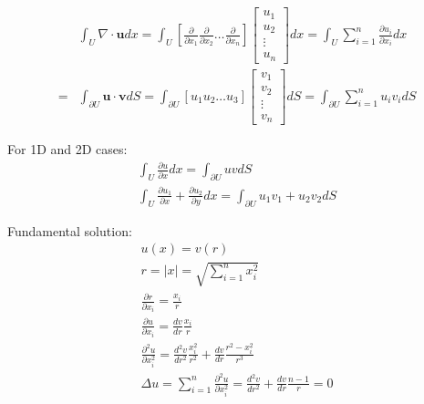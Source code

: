 \documentclass{article}
\begin{document}
\begin{theorem}
    \begin{equation}
        \begin{aligned}
              & \int_{U} \nabla \cdot \boldsymbol{u} dx =
            \int_{U}
            \left[ \frac{\partial}{\partial x_{1}} \frac{\partial}{\partial x_{2}} \dots \frac{\partial}{\partial x_{n}} \right]
            \begin{bmatrix}
                u_{1}  \\
                u_{2}  \\
                \vdots \\
                u_{n}
            \end{bmatrix} dx
            = \int_{U} \sum_{i=1}^{n} \frac{\partial u_{i}}{\partial x_{i}} dx \\
            = & \int_{\partial U} \boldsymbol{u} \cdot \boldsymbol{v} dS
            = \int_{\partial U}
            \left[ u_{1} u_{2} \dots u_{3} \right]
            \begin{bmatrix}
                v_{1}  \\
                v_{2}  \\
                \vdots \\
                v_{n}
            \end{bmatrix} dS
            = \int_{\partial U} \sum_{i=1}^{n} u_{i}v_{i} dS
        \end{aligned}
    \end{equation}
\end{theorem}

\begin{example}
    For 1D and 2D cases:
    \begin{gather*}
        \int_{U} \frac{\partial u}{\partial x} dx = \int_{\partial U} uv dS \\
        \int_{U} \frac{\partial u_{1}}{\partial x} + \frac{\partial u_{2}}{\partial y} dx =
        \int_{\partial U} u_{1}v_{1} + u_{2}v_{2} dS
    \end{gather*}
\end{example}

Fundamental solution:
\begin{gather*}
    u(x) = v(r) \\
    r = |x| = \sqrt{\sum_{i=1}^{n}x_{i}^{2}} \\
    \frac{\partial r}{\partial x_{i}} = \frac{x_{i}}{r} \\
    \frac{\partial u}{\partial x_{i}} = \frac{dv}{dr} \frac{x_{i}}{r} \\
    \frac{\partial^{2} u}{\partial x_{i}^{2}} = \frac{d^{2}v}{dr^{2}} \frac{x_{i}^{2}}{r^{2}}
    + \frac{dv}{dr} \frac{r^{2} - x_{i}^{2}}{r^{3}} \\
    \Delta u = \sum_{i=1}^{n} \frac{\partial^{2} u}{\partial x_{i}^{2}} = \frac{d^{2}v}{dr^{2}} + \frac{dv}{dr}\frac{n-1}{r} = 0
\end{gather*}
\end{document}
